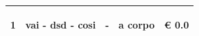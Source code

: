 \documentclass[a4paper]{article}
\begin{document}
\begin{tabular}{ | L{10mm} |  L{86mm} | L{12mm} | L{12mm} | L{16mm} | }
                              \vspace{2.5mm}
                              \begin{spacing}{0}
                           1
                              \end{spacing} &
                              \vspace{2.5mm}
                              \begin{spacing}{0}
                           vai - dsd - cosi
                              \end{spacing} &
                              \vspace{2.5mm}
                              \begin{spacing}{0}
                           -
                              \end{spacing} &
                              \vspace{2.5mm}
                              \begin{spacing}{0}
                           a corpo
                              \end{spacing} &
                              \vspace{2.5mm}
                              \begin{spacing}{0}
                                \euro\hfill 
                            0.0
                              \end{spacing} \\
                              \hline


\end{tabular}
\end{document}
